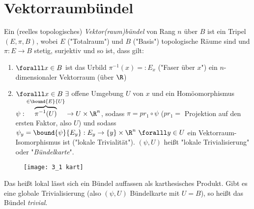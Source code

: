 \chapter{Vektorraumbündel}\lecture 


\begin{defn}[Vektorraumbündel]
	Ein (reelles topologisches) \emph{Vektor(raum)bündel} von Rang $n$ über $B$ ist ein Tripel $(E,\pi,B)$, wobei $E$ ("Totalraum") und $B$ ("Basis") topologische Räume sind und $\pi: E \to B$ stetig, surjektiv und so ist, dass gilt:
	\begin{enumerate}[label={\roman*})]
		\item $\foralll x \in B$ ist das Urbild $\pi^{-1}(x) =: E_x$ ("Faser über $x$") ein $n$-dimensionaler Vektorraum (über $\R$)
		\item $\foralll x \in B \ \exists$ offene Umgebung $U$ von $x$ und ein Homöomorphismus $\psi: \overbrace{\pi^{-1} (U)}^{\in \bound{E}{U}} \to U \times \R^n$, sodass $\pi = pr_1 \circ \psi$ ($pr_1 =$ Projektion auf den ersten Faktor, also $U$) und sodass $\psi_y = \bound{\psi}{E_y} : E_y \to \{y\} \times \R^n \ \foralll y \in U$ ein Vektorraum-Isomorphismus ist ("lokale Trivialität"). $(\psi,U)$ heißt "lokale Trivialisierung" oder "\emph{Bündelkarte}".
	\end{enumerate}
\end{defn}

\begin{minipage}{\linewidth}
	\begin{wrapfigure}{R}{8cm}
		\centering
		\texttt{[image: 3\_1 kart]}
	\end{wrapfigure}

	Das heißt lokal lässt sich ein Bündel auffassen als karthesisches Produkt. Gibt es eine globale Trivialisierung (also $(\psi,U)$ Bündelkarte mit $U = B$), so heißt das Bündel \emph{trivial}.
\end{minipage}

